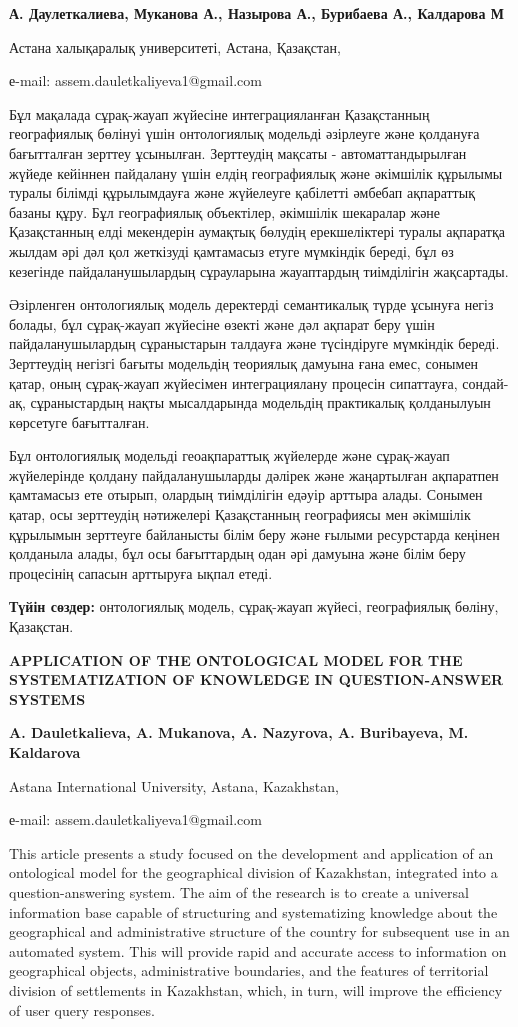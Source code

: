\textbf{А. Даулеткалиева, Муканова А., Назырова А., Бурибаева А.,
Калдарова М}

Астана халықаралық университеті, Астана, Қазақстан,

е-mail: assem.dauletkaliyeva1@gmail.com

Бұл мақалада сұрақ-жауап жүйесіне интеграцияланған Қазақстанның
географиялық бөлінуі үшін онтологиялық модельді әзірлеуге және қолдануға
бағытталған зерттеу ұсынылған. Зерттеудің мақсаты - автоматтандырылған
жүйеде кейіннен пайдалану үшін елдің географиялық және әкімшілік
құрылымы туралы білімді құрылымдауға және жүйелеуге қабілетті әмбебап
ақпараттық базаны құру. Бұл географиялық объектілер, әкімшілік шекаралар
және Қазақстанның елді мекендерін аумақтық бөлудің ерекшеліктері туралы
ақпаратқа жылдам әрі дәл қол жеткізуді қамтамасыз етуге мүмкіндік
береді, бұл өз кезегінде пайдаланушылардың сұрауларына жауаптардың
тиімділігін жақсартады.

Әзірленген онтологиялық модель деректерді семантикалық түрде ұсынуға
негіз болады, бұл сұрақ-жауап жүйесіне өзекті және дәл ақпарат беру үшін
пайдаланушылардың сұраныстарын талдауға және түсіндіруге мүмкіндік
береді. Зерттеудің негізгі бағыты модельдің теориялық дамуына ғана емес,
сонымен қатар, оның сұрақ-жауап жүйесімен интеграциялану процесін
сипаттауға, сондай-ақ, сұраныстардың нақты мысалдарында модельдің
практикалық қолданылуын көрсетуге бағытталған.

Бұл онтологиялық модельді геоақпараттық жүйелерде және сұрақ-жауап
жүйелерінде қолдану пайдаланушыларды дәлірек және жаңартылған ақпаратпен
қамтамасыз ете отырып, олардың тиімділігін едәуір арттыра алады. Сонымен
қатар, осы зерттеудің нәтижелері Қазақстанның географиясы мен әкімшілік
құрылымын зерттеуге байланысты білім беру және ғылыми ресурстарда
кеңінен қолданыла алады, бұл осы бағыттардың одан әрі дамуына және білім
беру процесінің сапасын арттыруға ықпал етеді.

\textbf{Түйін сөздер:} онтологиялық модель, сұрақ-жауап жүйесі,
географиялық бөліну, Қазақстан.

\textbf{APPLICATION OF THE ONTOLOGICAL MODEL FOR THE SYSTEMATIZATION OF
KNOWLEDGE IN QUESTION-ANSWER SYSTEMS}

\textbf{A. Dauletkalieva, A. Mukanova, A. Nazyrova, A. Buribayeva, M.
Kaldarova}

Astana International University, Astana, Kazakhstan,

е-mail: assem.dauletkaliyeva1@gmail.com

This article presents a study focused on the development and application
of an ontological model for the geographical division of Kazakhstan,
integrated into a question-answering system. The aim of the research is
to create a universal information base capable of structuring and
systematizing knowledge about the geographical and administrative
structure of the country for subsequent use in an automated system. This
will provide rapid and accurate access to information on geographical
objects, administrative boundaries, and the features of territorial
division of settlements in Kazakhstan, which, in turn, will improve the
efficiency of user query responses.

